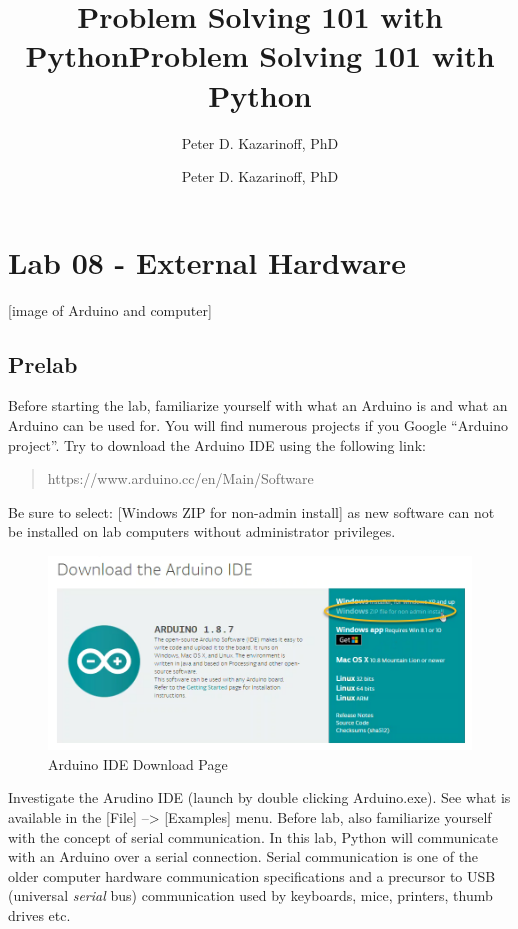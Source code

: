 \documentclass[11pt]{article}
\title{Problem Solving 101 with Python}
\author{Peter D. Kazarinoff, PhD}
\date{}
\title{Problem Solving 101 with Python}
\author{Peter D. Kazarinoff, PhD}
\date{}
\makeatletter
\def\maxwidth{\ifdim\Gin@nat@width>\linewidth\linewidth
    \else\Gin@nat@width\fi}
\let\Oldincludegraphics\includegraphics
\renewcommand{\includegraphics}[1]{\Oldincludegraphics[width=.8\maxwidth]{#1}}
\makeatother
\begin{document}
    
    
    

    
    

    
    \hypertarget{lab-08---external-hardware}{%
\section{Lab 08 - External Hardware}\label{lab-08---external-hardware}}

    {[}image of Arduino and computer{]}

    \hypertarget{prelab}{%
\subsection{Prelab}\label{prelab}}

Before starting the lab, familiarize yourself with what an Arduino is
and what an Arduino can be used for. You will find numerous projects if
you Google ``Arduino project''. Try to download the Arduino IDE using
the following link:

\begin{quote}
https://www.arduino.cc/en/Main/Software
\end{quote}

Be sure to select: {[}Windows ZIP for non-admin install{]} as new
software can not be installed on lab computers without administrator
privileges.

\begin{figure}
\centering
\includegraphics{images/arduino_download_page.png}
\caption{Arduino IDE Download Page}
\end{figure}

Investigate the Arudino IDE (launch by double clicking Arduino.exe). See
what is available in the {[}File{]} --\textgreater{} {[}Examples{]}
menu. Before lab, also familiarize yourself with the concept of serial
communication. In this lab, Python will communicate with an Arduino over
a serial connection. Serial communication is one of the older computer
hardware communication specifications and a precursor to USB (universal
\emph{serial} bus) communication used by keyboards, mice, printers,
thumb drives etc.
\end{document}
